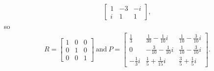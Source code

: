 \documentclass[12pt]{article}
\begin{document}
\begin{enumerate}
\begin{align*}
\begin{bmatrix}
        1 & -3 & -i\\
        i & 1 & 1
      \end{bmatrix},
    \end{align*}
    so
    \begin{align*}
      R =
      \begin{bmatrix}
        1 & 0 & 0\\
        0 & 1 & 0\\
        0 & 0 & 1
      \end{bmatrix}\ \text{and}\
      P =
      \begin{bmatrix}
        \frac{1}{3} & \frac{1}{30}-\frac{1}{10}i & \frac{1}{10}-\frac{3}{10}i\\
        0 & -\frac{3}{10}-\frac{1}{10}i & \frac{1}{10}-\frac{3}{10}i\\
        -\frac{1}{3}i & \frac{1}{5}+\frac{1}{15}i & \frac{3}{5}+\frac{1}{5}i
      \end{bmatrix}.
    \end{align*}


\end{enumerate}
\end{document}
